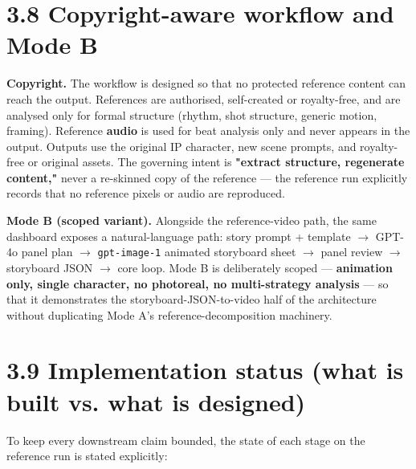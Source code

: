 \documentclass[10pt,twocolumn,letterpaper]{article}
\begin{document}
\section*{3.8 Copyright-aware workflow and Mode B}

\textbf{Copyright.} The workflow is designed so that no protected reference content can reach the output. References are authorised, self-created or royalty-free, and are analysed only for formal structure (rhythm, shot structure, generic motion, framing). Reference \textbf{audio} is used for beat analysis only and never appears in the output. Outputs use the original IP character, new scene prompts, and royalty-free or original assets. The governing intent is \textbf{"extract structure, regenerate content,"} never a re-skinned copy of the reference --- the reference run explicitly records that no reference pixels or audio are reproduced.

\textbf{Mode B (scoped variant).} Alongside the reference-video path, the same dashboard exposes a natural-language path: story prompt + template $\rightarrow$ GPT-4o panel plan $\rightarrow$ \texttt{gpt-image-1} animated storyboard sheet $\rightarrow$ panel review $\rightarrow$ storyboard JSON $\rightarrow$ core loop. Mode B is deliberately scoped --- \textbf{animation only, single character, no photoreal, no multi-strategy analysis} --- so that it demonstrates the storyboard-JSON-to-video half of the architecture without duplicating Mode A's reference-decomposition machinery.

\section*{3.9 Implementation status (what is built vs. what is designed)}

To keep every downstream claim bounded, the state of each stage on the reference run is stated explicitly:
\end{document}

